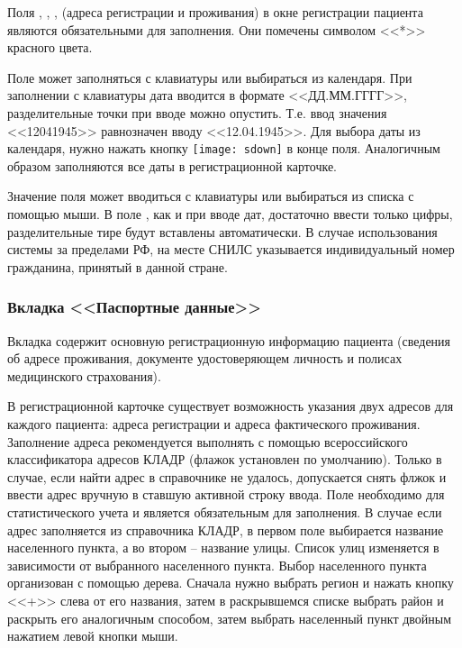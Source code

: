Поля , , ,  (адреса регистрации и проживания) в окне регистрации пациента являются обязательными для заполнения. Они помечены символом <<*>> красного цвета.

Поле  может заполняться с клавиатуры или выбираться из календаря. При заполнении с клавиатуры дата вводится в формате <<ДД.ММ.ГГГГ>>, разделительные точки при вводе можно опустить. Т.е. ввод значения <<12041945>> равнозначен вводу <<12.04.1945>>. Для выбора даты из календаря, нужно нажать кнопку \texttt{[image: sdown]}  в конце поля. Аналогичным образом заполняются все даты в регистрационной карточке.

Значение поля  может вводиться с клавиатуры или выбираться из списка с помощью мыши. В поле , как и при вводе дат, достаточно ввести только цифры, разделительные тире будут вставлены автоматически. В случае использования системы за пределами РФ, на месте СНИЛС указывается индивидуальный номер гражданина, принятый в данной стране.

\subsubsection{Вкладка <<Паспортные данные>>}

Вкладка  содержит основную регистрационную информацию пациента (сведения об адресе проживания, документе удостоверяющем личность и полисах медицинского страхования).

В регистрационной карточке существует возможность указания двух адресов для каждого пациента: адреса регистрации и адреса фактического проживания. Заполнение адреса рекомендуется выполнять с помощью всероссийского классификатора адресов КЛАДР (флажок  установлен по умолчанию). Только в случае, если найти адрес в справочнике не удалось, допускается снять флжок  и ввести адрес вручную в ставшую активной строку ввода. Поле  необходимо для статистического учета и является обязательным для заполнения. В случае если адрес заполняется из справочника КЛАДР, в первом поле выбирается название населенного пункта, а во втором – название улицы. Список улиц изменяется в зависимости от выбранного населенного пункта. Выбор населенного пункта организован с помощью дерева. Сначала нужно выбрать регион и нажать кнопку <<+>> слева от его названия, затем в раскрывшемся списке выбрать район и раскрыть его аналогичным способом, затем выбрать населенный пункт двойным нажатием левой кнопки мыши.

